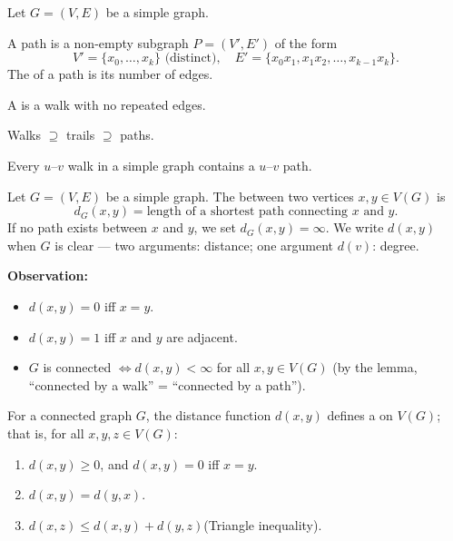 \documentclass[8pt,a4paper,landscape]{extarticle}
\begin{document}
\begin{cscolumns}
\begin{definition}
Let $G=(V,E)$ be a simple graph.

 A path is a non-empty subgraph $P=(V',E')$ of the form
\[ V'=\{x_0,\dots,x_k\}\text{ (distinct)},\quad E'=\{x_0x_1,x_1x_2,\dots,x_{k-1}x_k\}. \]
The  of a path is its number of edges.

A  is a walk with no repeated edges.
\end{definition}
\noindent Walks $\supseteq$ trails $\supseteq$ paths.

\begin{theorem}[Lemma]
Every $u$--$v$ walk in a simple graph contains a $u$--$v$ path.
\end{theorem}

\begin{definition}[Distance]
Let $G=(V,E)$ be a simple graph. The  between two vertices $x,y\in V(G)$ is
\[ d_G(x,y)=\text{length of a shortest path connecting }x\text{ and }y. \]
If no path exists between $x$ and $y$, we set $d_G(x,y)=\infty$. We write $d(x,y)$ when $G$ is clear --- two arguments: distance; one argument $d(v)$: degree.
\end{definition}
\textbf{Observation:}
\begin{itemize}
\item $d(x,y)=0$ iff $x=y$.
\item $d(x,y)=1$ iff $x$ and $y$ are adjacent.
\item $G$ is connected $\iff d(x,y)<\infty$ for all $x,y\in V(G)$ (by the lemma, ``connected by a walk'' = ``connected by a path'').
\end{itemize}

\begin{theorem}
For a connected graph $G$, the distance function $d(x,y)$ defines a  on $V(G)$; that is, for all $x,y,z\in V(G)$:
\begin{enumerate}[label=(\roman*)]
\item $d(x,y)\ge 0$, and $d(x,y)=0$ iff $x=y$.
\item $d(x,y)=d(y,x)$.
\item $d(x,z)\le d(x,y)+d(y,z)$\quad(Triangle inequality).
\end{enumerate}
\end{theorem}


\end{cscolumns}
\end{document}
